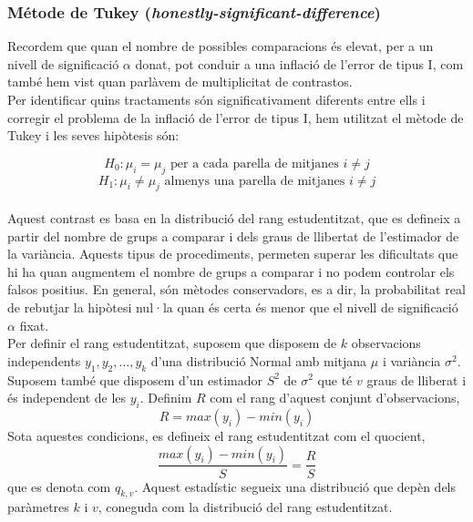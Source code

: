 \documentclass[english]{article}
\begin{document}
\subsubsection{Métode de Tukey (\textit{honestly-significant-difference})}
Recordem que quan el nombre de possibles comparacions és elevat, per a un nivell de significació $\alpha$ donat, pot conduir a una inflació de l'error de tipus I, com també hem vist quan parlàvem de multiplicitat de contrastos.
\\
Per identificar quins tractaments són significativament diferents entre ells i corregir el problema de la inflació de l'error de tipus I, hem utilitzat el mètode de Tukey i les seves hipòtesis són:

\begin{equation*}
H_{0}: \mu_i = \mu_j \text{ per a cada parella de mitjanes }  i \neq j
\end{equation*}
\vspace{-0.5cm}
\begin{equation*}
H_{1}: \mu_i \neq \mu_j \text{ almenys una parella de mitjanes }  i \neq j
\end{equation*}
\\
Aquest contrast es basa en la distribució del rang estudentitzat, que es defineix a partir del nombre de grups a comparar i dels graus de llibertat de l'estimador de la variància. Aquests tipus de procediments, permeten superar les dificultats que hi ha quan augmentem el nombre de grups a comparar i no podem controlar els falsos positius. En general, són mètodes conservadors, es a dir, la probabilitat real de rebutjar la hipòtesi nul·la quan és certa és menor que el nivell de significació $\alpha$ fixat.
\\

Per definir el rang estudentitzat, suposem que disposem de $k$ observacions independents $y_1,y_2,...,y_k$ d'una distribució Normal amb mitjana $\mu$ i variància $\sigma^2$. Suposem també que disposem d'un estimador $S^2$ de $\sigma^2$ que té $v$ graus de lliberat i és independent de les $y_i$. Definim $R$ com el rang d'aquest conjunt d'observacions,
\begin{equation*}
R = max(y_i) - min(y_i)
\end{equation*}
Sota aquestes condicions, es defineix el rang estudentitzat com el quocient,
\begin{equation*}
\frac{max(y_i) - min(y_i)}{S} = \frac{R}{S}
\end{equation*}
que es denota com $q_{k,v}$. Aquest estadístic segueix una distribució que depèn dels paràmetres $k$ i $v$, coneguda com la distribució del rang estudentitzat.
\\
\end{document}
